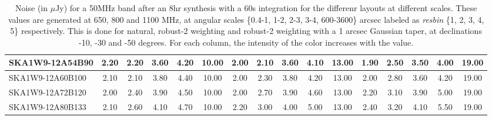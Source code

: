 \begin{table}[H]
{{\begin{tabular}{|lccccc||ccccc||ccccc|}
SKA1W9-12A54B90 & 2.20 \cellcolor{blue!28.50} & 2.20 \cellcolor{red!21.23} & 3.60 \cellcolor{green!18.00} & 4.20 \cellcolor{orange!18.00} & 10.00 \cellcolor{purple!60.00} & 2.00 \cellcolor{blue!18.00} & 2.10 \cellcolor{red!18.00} & 3.60 \cellcolor{green!18.00} & 4.10 \cellcolor{orange!18.00} & 13.00 \cellcolor{purple!18.00} & 1.90 \cellcolor{blue!18.00} & 2.50 \cellcolor{red!18.00} & 3.50 \cellcolor{green!18.00} & 4.00 \cellcolor{orange!18.00} & 19.00 \cellcolor{purple!60.00}\\ \hline 
SKA1W9-12A60B100 & 2.10 \cellcolor{blue!23.25} & 2.10 \cellcolor{red!18.00} & 3.80 \cellcolor{green!27.33} & 4.40 \cellcolor{orange!34.80} & 10.00 \cellcolor{purple!60.00} & 2.00 \cellcolor{blue!18.00} & 2.30 \cellcolor{red!24.00} & 3.80 \cellcolor{green!30.00} & 4.20 \cellcolor{orange!22.67} & 13.00 \cellcolor{purple!18.00} & 2.00 \cellcolor{blue!22.67} & 2.80 \cellcolor{red!32.00} & 3.60 \cellcolor{green!25.00} & 4.20 \cellcolor{orange!23.60} & 19.00 \cellcolor{purple!60.00}\\ \hline 
SKA1W9-12A72B120 & 2.00 \cellcolor{blue!18.00} & 2.40 \cellcolor{red!27.69} & 3.90 \cellcolor{green!32.00} & 4.50 \cellcolor{orange!43.20} & 10.00 \cellcolor{purple!60.00} & 2.00 \cellcolor{blue!18.00} & 2.70 \cellcolor{red!36.00} & 3.90 \cellcolor{green!36.00} & 4.60 \cellcolor{orange!41.33} & 13.00 \cellcolor{purple!18.00} & 2.20 \cellcolor{blue!32.00} & 3.10 \cellcolor{red!46.00} & 3.90 \cellcolor{green!46.00} & 5.00 \cellcolor{orange!46.00} & 19.00 \cellcolor{purple!60.00}\\ \hline 
SKA1W9-12A80B133 & 2.10 \cellcolor{blue!23.25} & 2.60 \cellcolor{red!34.15} & 4.10 \cellcolor{green!41.33} & 4.70 \cellcolor{orange!60.00} & 10.00 \cellcolor{purple!60.00} & 2.20 \cellcolor{blue!28.50} & 3.00 \cellcolor{red!45.00} & 4.00 \cellcolor{green!42.00} & 5.00 \cellcolor{orange!60.00} & 13.00 \cellcolor{purple!18.00} & 2.40 \cellcolor{blue!41.33} & 3.20 \cellcolor{red!50.67} & 4.10 \cellcolor{green!60.00} & 5.50 \cellcolor{orange!60.00} & 19.00 \cellcolor{purple!60.00}\\ \hline 
\end{tabular}}
\vspace{-0.300000cm}
\hspace{1cm} 

\vspace{.50cm}
\caption{Noise (in $\mu$Jy) for a 50MHz band after an 8hr synthesis with a 60s integration for the differenr layouts at different scales. These values are generated at 650, 800 and 1100 MHz, at angular scales \{0.4-1, 1-2, 2-3, 3-4, 600-3600\} arcsec labeled as {\it resbin} \{1, 2, 3, 4, 5\} respectively. This is done for natural, robust-2 weighting and robust-2 weighting with a 1 arcsec Gaussian taper, at declinations -10, -30 and -50 degrees. For each column, the intensity of the color increases with the value.}\label{tab:noise50}}
 \end{table}
